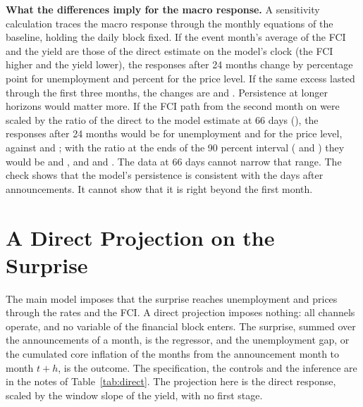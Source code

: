 \documentclass[11pt]{article}
\begin{document}
\begin{appendices}
\textbf{What the differences imply for the macro response.} A sensitivity calculation traces the macro response through the monthly equations of the baseline, holding the daily block fixed. If the event month's average of the FCI and the yield are those of the direct estimate on the model's clock (the FCI  higher and the yield  lower), the responses after 24 months change by  percentage point for unemployment and  percent for the price level. If the same excess lasted through the first three months, the changes are  and . Persistence at longer horizons would matter more. If the FCI path from the second month on were scaled by the ratio of the direct to the model estimate at 66 days (), the responses after 24 months would be  for unemployment and  for the price level, against  and ; with the ratio at the ends of the 90 percent interval ( and ) they would be  and , and  and . The data at 66 days cannot narrow that range. The check shows that the model's persistence is consistent with the days after announcements. It cannot show that it is right beyond the first month.



\FloatBarrier
\section{A Direct Projection on the Surprise}\label{app:direct}
The main model imposes that the surprise reaches unemployment and prices through the rates and the FCI. A direct projection imposes nothing: all channels operate, and no variable of the financial block enters. The surprise, summed over the announcements of a month, is the regressor, and the unemployment gap, or the cumulated core inflation of the months from the announcement month to month $t+h$, is the outcome. The specification, the controls and the inference are in the notes of Table~\ref{tab:direct}. The projection here is the direct response, scaled by the window slope of the yield, with no first stage.


\end{appendices}
\end{document}
